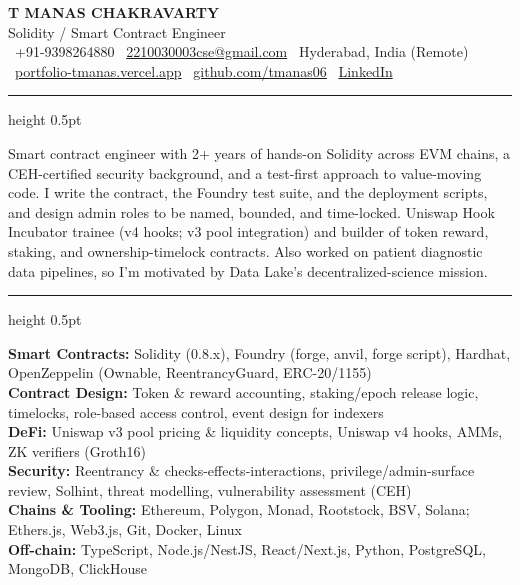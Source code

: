 \documentclass[11pt,a4paper]{article}
\newcommand{\cvsection}[1]{%
  \vspace{6pt}%
  \noindent{\large\textbf{\MakeUppercase{#1}}}%
  \vspace{2pt}%
  \hrule height 0.5pt%
  \vspace{4pt}%
}
\begin{document}
\begin{center}
  {\Huge \textbf{T MANAS CHAKRAVARTY}} \\[3pt]
  {\large Solidity / Smart Contract Engineer} \\[5pt]
  \small
  \faPhone*\ +91-9398264880 \quad \textbar \quad
  \faEnvelope\ \href{mailto:2210030003cse@gmail.com}{2210030003cse@gmail.com} \quad \textbar \quad
  \faMapMarker*\ Hyderabad, India (Remote) \\[3pt]
  \faGlobe\ \href{https://portfolio-tmanas.vercel.app}{portfolio-tmanas.vercel.app} \quad \textbar \quad
  \faGithub\ \href{https://github.com/tmanas06}{github.com/tmanas06} \quad \textbar \quad
  \faLinkedin\ \href{https://linkedin.com/in/t-manas-chakravarty-91958224b}{LinkedIn}
\end{center}

\cvsection{Summary}
\noindent Smart contract engineer with 2+ years of hands-on Solidity across EVM chains, a CEH-certified security background, and a test-first
approach to value-moving code. I write the contract, the Foundry test suite, and the deployment scripts, and design admin roles to be
named, bounded, and time-locked. Uniswap Hook Incubator trainee (v4 hooks; v3 pool integration) and builder of token reward, staking, and
ownership-timelock contracts. Also worked on patient diagnostic data pipelines, so I'm motivated by Data Lake's decentralized-science mission.

\cvsection{Technical Skills}
\noindent\textbf{Smart Contracts:} Solidity (0.8.x), Foundry (forge, anvil, forge script), Hardhat, OpenZeppelin (Ownable, ReentrancyGuard, ERC-20/1155) \\
\textbf{Contract Design:} Token \& reward accounting, staking/epoch release logic, timelocks, role-based access control, event design for indexers \\
\textbf{DeFi:} Uniswap v3 pool pricing \& liquidity concepts, Uniswap v4 hooks, AMMs, ZK verifiers (Groth16) \\
\textbf{Security:} Reentrancy \& checks-effects-interactions, privilege/admin-surface review, Solhint, threat modelling, vulnerability assessment (CEH) \\
\textbf{Chains \& Tooling:} Ethereum, Polygon, Monad, Rootstock, BSV, Solana; Ethers.js, Web3.js, Git, Docker, Linux \\
\textbf{Off-chain:} TypeScript, Node.js/NestJS, React/Next.js, Python, PostgreSQL, MongoDB, ClickHouse
\end{document}

